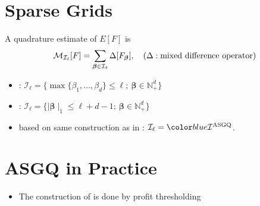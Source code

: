 \documentclass[ima, 20pt, portrait, plainboxedsections]{sciposter}
\begin{document}
\begin{multicols}{3}
%
%
\section*{Sparse Grids}
A quadrature estimate of $E[F]$ is
\begin{equation}\label{eq:Quadrature_estimator}
\mathcal{M}_{\mathcal{I_{\ell}}}[F]=\sum_{\boldsymbol{\beta} \in \mathcal{I}_{\ell}} \Delta [F_{\boldsymbol{\beta}}], \quad (\Delta:  \text{mixed difference operator})
\end{equation}
\begin{itemize}
\item {}: $\mathcal{I}_{\ell}=\{ \max\{\beta_1,\dots,\beta_d \} \le \ell;\: \boldsymbol{\beta} \in \mathbb{N}^d_{+} \} $
\item {}: $ \mathcal{I}_{\ell}=\{  \mid \boldsymbol{\beta} \mid_1 \le \ell+d-1; \: \boldsymbol{\beta} \in \mathbb{N}^d_{+} \} $

\item {} based on same construction as in \cite{haji2016multi}: $\mathcal{I}_{\ell}=\blue{\mathcal{I}^{\text{ASGQ}}}$.
\end{itemize}
\section*{ASGQ in Practice}
\begin{itemize}
		\item The construction of  is done by profit thresholding
		

\end{itemize}
\end{multicols}
\end{document}

